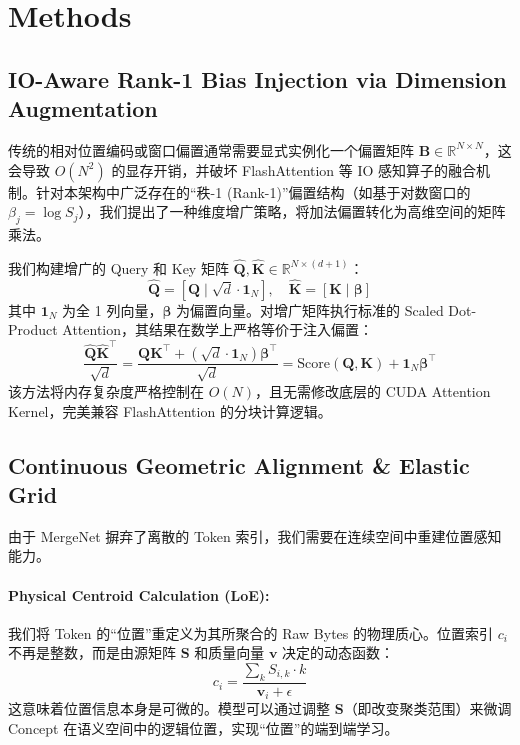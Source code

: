 \documentclass[a4paper,11pt]{ctexart}
\begin{document}
\section{Methods}

\subsection{IO-Aware Rank-1 Bias Injection via Dimension Augmentation}
传统的相对位置编码或窗口偏置通常需要显式实例化一个偏置矩阵 $\mathbf{B} \in \mathbb{R}^{N \times N}$，这会导致 $O(N^2)$ 的显存开销，并破坏 FlashAttention 等 IO 感知算子的融合机制。针对本架构中广泛存在的“秩-1 (Rank-1)”偏置结构（如基于对数窗口的 $\beta_j = \log S_j$），我们提出了一种维度增广策略，将加法偏置转化为高维空间的矩阵乘法。

我们构建增广的 Query 和 Key 矩阵 $\hat{\mathbf{Q}}, \hat{\mathbf{K}} \in \mathbb{R}^{N \times (d+1)}$：
\begin{equation}
    \hat{\mathbf{Q}} = [\mathbf{Q} \mid \sqrt{d} \cdot \mathbf{1}_N], \quad \hat{\mathbf{K}} = [\mathbf{K} \mid \boldsymbol{\beta}]
\end{equation}
其中 $\mathbf{1}_N$ 为全 1 列向量，$\boldsymbol{\beta}$ 为偏置向量。对增广矩阵执行标准的 Scaled Dot-Product Attention，其结果在数学上严格等价于注入偏置：
\begin{equation}
    \frac{\hat{\mathbf{Q}}\hat{\mathbf{K}}^\top}{\sqrt{d}} = \frac{\mathbf{Q}\mathbf{K}^\top + (\sqrt{d}\cdot\mathbf{1}_N)\boldsymbol{\beta}^\top}{\sqrt{d}} = \text{Score}(\mathbf{Q}, \mathbf{K}) + \mathbf{1}_N \boldsymbol{\beta}^\top
\end{equation}
该方法将内存复杂度严格控制在 $O(N)$，且无需修改底层的 CUDA Attention Kernel，完美兼容 FlashAttention 的分块计算逻辑。

\subsection{Continuous Geometric Alignment \& Elastic Grid}
由于 MergeNet 摒弃了离散的 Token 索引，我们需要在连续空间中重建位置感知能力。

\paragraph{Physical Centroid Calculation (LoE):}
我们将 Token 的“位置”重定义为其所聚合的 Raw Bytes 的物理质心。位置索引 $c_i$ 不再是整数，而是由源矩阵 $\mathbf{S}$ 和质量向量 $\mathbf{v}$ 决定的动态函数：
\begin{equation}
  c_i = \frac{\sum_k S_{i,k} \cdot k}{\mathbf{v}_i + \epsilon}
\end{equation}
这意味着位置信息本身是可微的。模型可以通过调整 $\mathbf{S}$（即改变聚类范围）来微调 Concept 在语义空间中的逻辑位置，实现“位置”的端到端学习。
\end{document}
